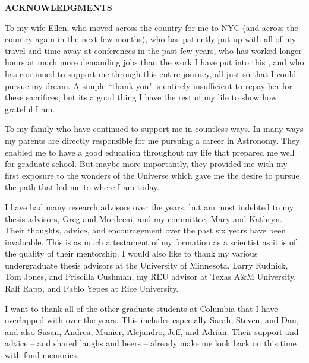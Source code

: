 %
%
%
%

\newpage

\begin{center}

{\large \bf ACKNOWLEDGMENTS } %

\end{center}

\vspace{0.8cm}

To my wife Ellen, who moved across the country for me to NYC
(and across the country again in the next few months), who has patiently put up with
all of my travel and time away at conferences in the past few years,
who has worked longer hours at much more demanding jobs than the work I have put
into this \Dissertation, and who has continued to support me through this
entire journey, all just so that I could pursue my dream. A simple ``thank you" is
entirely insufficient to repay her for these sacrifices, but its a good thing
I have the rest of my life to show how grateful I am.

To my family who have continued to support me in countless ways.
In many ways my parents are directly responsible for me pursuing a career in Astronomy.
They enabled me to have a good education throughout my life that prepared me
well for graduate school. But maybe more importantly, they provided me with my
first exposure to the wonders of the Universe which gave me the desire to
pursue the path that led me to where I am today.

I have had many research advisors over the years, but am most indebted to
my thesis advisors, Greg and Mordecai, and my committee, Mary and Kathryn. Their
thoughts, advice, and encouragement over the past six years have been invaluable.
This \dissertation  is as much a testament of my formation as a scientist as it
is of the quality of their mentorship. I would also like to thank my various
undergraduate thesis advisors at the University of Minnesota,
Larry Rudnick, Tom Jones, and Priscilla Cushman, my REU advisor at
Texas A\&M University, Ralf Rapp, and Pablo Yepes at Rice University.

I want to thank all of the other graduate students at Columbia that I have overlapped
with over the years. This includes especially Sarah, Steven, and Dan,
and also Susan, Andrea, Munier, Alejandro, Jeff, and Adrian.
Their support and advice -- and shared laughs and beers --
already make me look back on this time with fond memories.

